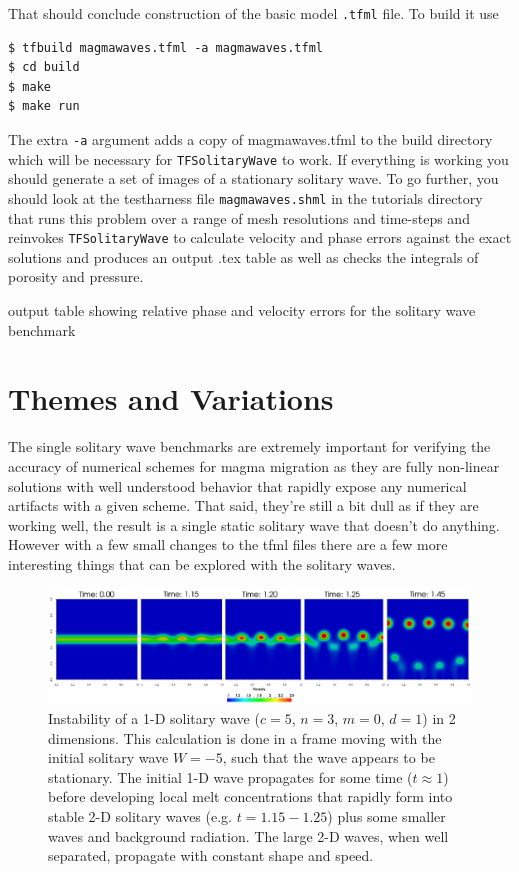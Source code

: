 That should conclude construction of the basic model \texttt{.tfml}
file.  To build it use
\begin{lstlisting}[style=Bash]
$ tfbuild magmawaves.tfml -a magmawaves.tfml
$ cd build
$ make
$ make run 
\end{lstlisting}
The extra \texttt{-a} argument adds a copy of magmawaves.tfml to the
build directory which will be necessary for \texttt{TFSolitaryWave} to
work.  If everything is working you should generate a set of images of a
stationary solitary wave.  To go further, you should look at the
testharness file \texttt{magmawaves.shml} in the tutorials directory
that runs this problem over a range of mesh resolutions and time-steps
and reinvokes \texttt{TFSolitaryWave} to calculate velocity and phase
errors against the exact solutions and produces an output .tex table
as well as checks the integrals of porosity and pressure.
\begin{table}[h]
  \centering
  \caption{output table showing relative phase and velocity errors for the
    solitary wave benchmark}
  \label{benchmark_table}
  
\end{table}


\section{Themes and Variations}
\label{sec:themes-variations}

The single solitary wave benchmarks are extremely important for
verifying the accuracy of numerical schemes for magma migration as
they are fully non-linear solutions with well understood behavior that
rapidly expose any numerical artifacts with a given scheme.  That
said,  they're still a bit dull as if they are working well,  the
result is a single static solitary wave that doesn't do anything.
However with a few small changes to the tfml files  there are a few
more interesting things that can be explored with the solitary waves. 

\begin{figure}[htbp!]
  \centering
  \includegraphics[width=\textwidth]{figures/1dto2d.pdf}
  \caption{Instability of a 1-D solitary wave ($c=5$, $n=3$, $m=0$,
    $d=1$) in 2 dimensions. This calculation is done in a frame moving
    with the initial solitary wave $W=-5$, such that the wave appears
    to be stationary. The initial 1-D wave propagates for some time
    ($t\approx 1$) before developing local melt concentrations that
    rapidly form into stable 2-D solitary waves (e.g. $t=1.15-1.25$)
    plus some smaller waves and background radiation.  The large 2-D
    waves, when well separated, propagate with constant shape and speed.}
  \label{fig:1dto2d}
\end{figure}

